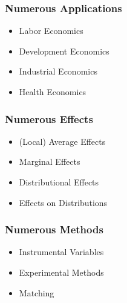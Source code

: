 
\begin{frame}
\frametitle{Numerous Applications}
\begin{itemize}
\item
  Labor Economics
\item
  Development Economics
\item
  Industrial Economics
\item
  Health Economics
\end{itemize} 

\end{frame}
    

    
\begin{frame}
\frametitle{Numerous Effects}

\begin{itemize}
\item
  (Local) Average Effects
\item
  Marginal Effects
\item
  Distributional Effects
\item
  Effects on Distributions
\end{itemize}

\end{frame}

   
\begin{frame}
\frametitle{Numerous Methods}

\begin{itemize}
\item
  Instrumental Variables
\item
  Experimental Methods
\item
  Matching
\end{itemize}  

\end{frame}


